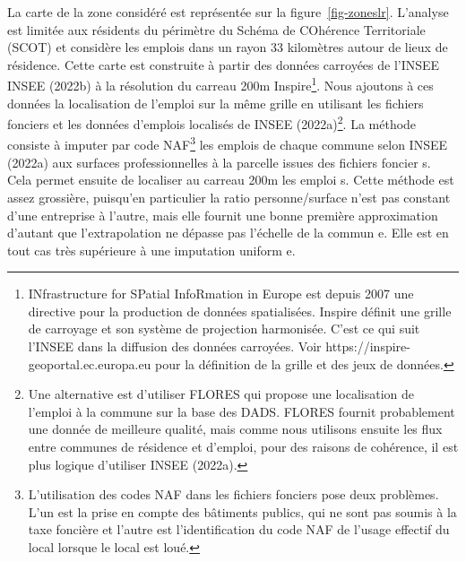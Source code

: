 \documentclass[
  10pt,
  a4paper,
  numbers=noendperiod,
  DIV=12]{scrartcl}
\begin{document}
La carte de la zone considéré est représentée sur la
figure~\ref{fig-zoneslr}. L'analyse est limitée aux résidents du
périmètre du Schéma de COhérence Territoriale (SCOT) et considère les
emplois dans un rayon 33 kilomètres autour de lieux de résidence. Cette
carte est construite à partir des données carroyées de l'INSEE INSEE
(2022b) à la résolution du carreau 200m Inspire\footnote{INfrastructure
  for SPatial InfoRmation in Europe est depuis 2007 une directive pour
  la production de données spatialisées. Inspire définit une grille de
  carroyage et son système de projection harmonisée. C'est ce qui suit
  l'INSEE dans la diffusion des données carroyées. Voir
  https://inspire-geoportal.ec.europa.eu pour la définition de la grille
  et des jeux de données.}. Nous ajoutons à ces données la localisation
de l'emploi sur la même grille en utilisant les fichiers fonciers et les
données d'emplois localisés de INSEE (2022a)\footnote{Une alternative
  est d'utiliser FLORES qui propose une localisation de l'emploi à la
  commune sur la base des DADS. FLORES fournit probablement une donnée
  de meilleure qualité, mais comme nous utilisons ensuite les flux entre
  communes de résidence et d'emploi, pour des raisons de cohérence, il
  est plus logique d'utiliser INSEE (2022a).}. La méthode consiste à
imputer par code NAF\footnote{L'utilisation des codes NAF dans les
  fichiers fonciers pose deux problèmes. L'un est la prise en compte des
  bâtiments publics, qui ne sont pas soumis à la taxe foncière et
  l'autre est l'identification du code NAF de l'usage effectif du local
  lorsque le local est loué.} les emplois de chaque commune selon INSEE
(2022a) aux surfaces professionnelles à la parcelle issues des fichiers
foncier s. Cela permet ensuite de localiser au carreau 200m les emploi
s. Cette méthode est assez grossière, puisqu'en particulier la ratio
personne/surface n'est pas constant d'une entreprise à l'autre, mais
elle fournit une bonne première approximation d'autant que
l'extrapolation ne dépasse pas l'échelle de la commun e. Elle est en
tout cas très supérieure à une imputation uniform e.
\end{document}
